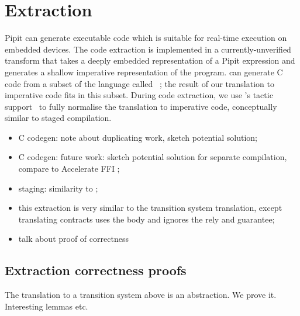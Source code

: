 

\section{Extraction}
\label{s:extraction}

Pipit can generate executable code which is suitable for real-time execution on embedded devices.
The code extraction is implemented in a currently-unverified transform that takes a deeply embedded representation of a Pipit expression and generates a shallow imperative representation of the program.
\fstar{} can generate C code from a subset of the language called \lowstar{}~\cite{protzenko2017verified}; the result of our translation to imperative code fits in this subset.
During code extraction, we use \fstar{}'s tactic support~\cite{martinez2019meta} to fully normalise the translation to imperative code, conceptually similar to staged compilation.






\TODO{}
\begin{itemize}
  \item C codegen: note about duplicating work, sketch potential solution;
  \item C codegen: future work: sketch potential solution for separate compilation, compare to Accelerate FFI \cite{clifton2014embedding};
  \item staging: similarity to \cite{gallego2021w};
  \item this extraction is very similar to the transition system translation, except translating contracts uses the body and ignores the rely and guarantee;
  \item talk about proof of correctness
\end{itemize}

\subsection{Extraction correctness proofs}
\label{s:extraction:proof}

The translation to a transition system above is an abstraction.
We prove it.
Interesting lemmas etc.

